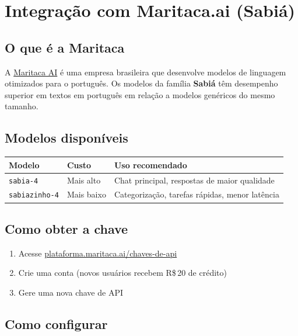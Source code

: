 \documentclass[12pt,a4paper]{article}
\begin{document}
\section{Integração com Maritaca.ai (Sabiá)}

\subsection{O que é a Maritaca}

A \href{https://maritaca.ai}{Maritaca AI} é uma empresa brasileira que desenvolve modelos
de linguagem otimizados para o português. Os modelos da família \textbf{Sabiá} têm
desempenho superior em textos em português em relação a modelos genéricos do mesmo tamanho.

\subsection{Modelos disponíveis}

\begin{tabularx}{\linewidth}{llL}
  \toprule
  \textbf{Modelo} & \textbf{Custo} & \textbf{Uso recomendado} \\
  \midrule
  \texttt{sabia-4} & Mais alto & Chat principal, respostas de maior qualidade \\
  \texttt{sabiazinho-4} & Mais baixo & Categorização, tarefas rápidas, menor latência \\
  \bottomrule
\end{tabularx}

\subsection{Como obter a chave}

\begin{enumerate}
  \item Acesse \href{https://plataforma.maritaca.ai/chaves-de-api}{plataforma.maritaca.ai/chaves-de-api}
  \item Crie uma conta (novos usuários recebem R\$\,20 de crédito)
  \item Gere uma nova chave de API
\end{enumerate}

\subsection{Como configurar}
\end{document}

